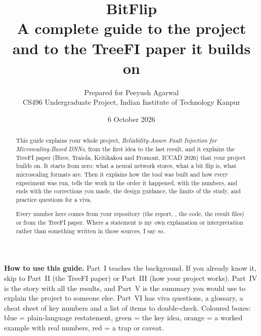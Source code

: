 \documentclass[11pt,a4paper]{article}
\title{\textbf{BitFlip}\\[4pt]\Large A complete guide to the project\\ and to the TreeFI paper it builds on}
\author{Prepared for Peeyush Agarwal\\[2pt]\small CS496 Undergraduate Project, Indian Institute of Technology Kanpur}
\date{6 October 2026}
\DeclareRobustCommand{\code}[1]{\texttt{\detokenize{#1}}}
\begin{document}
\maketitle
\thispagestyle{empty}

\begin{abstract}
\noindent This guide explains your whole project, \emph{Reliability-Aware Fault Injection for
Microscaling-Based DNNs}, from the first idea to the last result, and it explains the TreeFI
paper (Bires, Traiola, Kritikakou and Fromont, ICCAD 2026) that your project builds on. It starts
from zero: what a neural network stores, what a bit flip is, what microscaling formats are. Then
it explains how the tool \code{mxfi} was built and how every experiment was run, tells the work
in the order it happened, with the numbers, and ends with the corrections you made, the design
guidance, the limits of the study, and practice questions for a viva.

\medskip\noindent Every number here comes from your repository (the report, \code{docs/findings.md},
the code, the result files) or from the TreeFI paper. Where a statement is my own explanation
or interpretation rather than something written in those sources, I say so.
\end{abstract}

\vspace{4pt}
\begin{plain}
\textbf{How to use this guide.} Part~I teaches the background. If you already know it, skip to
Part~II (the TreeFI paper) or Part~III (how your project works). Part~IV is the story with all the
results, and Part~V is the summary you would use to explain the project to someone else.
Part~VI has viva questions, a glossary, a cheat sheet of key numbers and a list of items to double-check.
Coloured boxes: \textcolor{plainc}{blue} = plain-language restatement, \textcolor{keyc}{green} = the
key idea, \textcolor{exc}{orange} = a worked example with real numbers, \textcolor{warnc}{red} = a trap or
caveat.
\end{plain}

\newpage
\tableofcontents
\newpage









\end{document}
